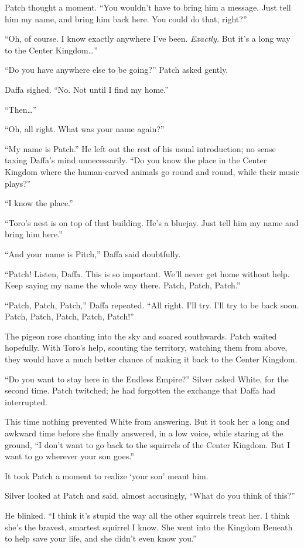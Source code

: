 \documentclass[12pt]{memoir}
\begin{document}
Patch thought a moment. “You wouldn’t have to bring him a
message. Just tell him my name, and bring him back here. You could do
that, right?”

“Oh, of course. I know exactly anywhere I’ve been. \textit{Exactly.}
But it’s a long way to the Center Kingdom…”

“Do you have anywhere else to be going?” Patch asked gently.

Daffa sighed. “No. Not until I find my home.”

“Then…”

“Oh, all right. What was your name again?”

“My name is Patch.” He left out the rest of his usual introduction; no
sense taxing Daffa’s mind unnecessarily. “Do you know the place in the
Center Kingdom where the human-carved animals go round and round,
while their music plays?”

“I know the place.”

“Toro’s nest is on top of that building. He’s a bluejay. Just tell him
my name and bring him here.”

“And your name is Pitch,” Daffa said doubtfully.

“Patch! Listen, Daffa. This is so important. We’ll never get home
without help. Keep saying my name the whole way there. Patch, Patch,
Patch.”

“Patch, Patch, Patch,” Daffa repeated. “All right. I’ll try. I’ll try
to be back soon. Patch, Patch, Patch, Patch, Patch!”

The pigeon rose chanting into the sky and soared southwards. Patch
waited hopefully. With Toro’s help, scouting the territory, watching
them from above, they would have a much better chance of making it
back to the Center Kingdom.

“Do you want to stay here in the Endless Empire?” Silver asked White,
for the second time. Patch twitched; he had forgotten the exchange
that Daffa had interrupted.

This time nothing prevented White from answering. But it took her a
long and awkward time before she finally answered, in a low voice,
while staring at the ground, “I don’t want to go back to the squirrels
of the Center Kingdom. But I want to go wherever your son goes.”

It took Patch a moment to realize ‘your son’ meant him.

Silver looked at Patch and said, almost accusingly, “What do you think
of this?”

He blinked. “I think it’s stupid the way all the other squirrels treat
her. I think she’s the bravest, smartest squirrel I know. She went
into the Kingdom Beneath to help save your life, and she didn’t even
know you.”
\end{document}
